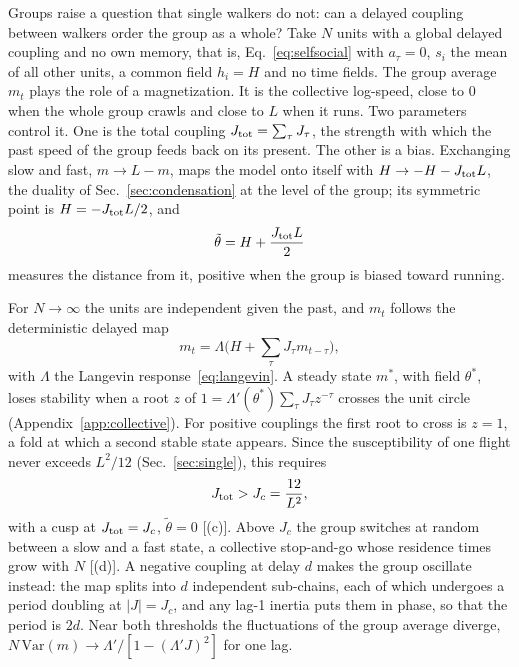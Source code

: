 Groups raise a question that single walkers do not: can a delayed coupling between walkers order the group as a whole? Take $N$ units with a global delayed coupling and no own memory, that is, Eq.~\eqref{eq:selfsocial} with $a_\tau=0$, $s_i$ the mean of all other units, a common field $h_i=H$ and no time fields. The group average $m_t$ plays the role of a magnetization. It is the collective log-speed, close to $0$ when the whole group crawls and close to $L$ when it runs. Two parameters control it. One is the total coupling $J_{\rm tot}=\sum_\tau J_\tau$, the strength with which the past speed of the group feeds back on its present. The other is a bias. Exchanging slow and fast, $m\to L-m$, maps the model onto itself with $H\to-H-J_{\rm tot}L$, the duality of Sec.~\ref{sec:condensation} at the level of the group; its symmetric point is $H=-J_{\rm tot}L/2$, and
\begin{equation}
\tilde\theta=H+\frac{J_{\rm tot}L}2
\end{equation}
measures the distance from it, positive when the group is biased toward running.

For $N\to\infty$ the units are independent given the past, and $m_t$ follows the deterministic delayed map
\begin{equation}
m_t=\Lambda\Big(H+\sum_\tau J_\tau m_{t-\tau}\Big),
\label{eq:map}
\end{equation}
with $\Lambda$ the Langevin response~\eqref{eq:langevin}. A steady state $m^*$, with field $\theta^*$, loses stability when a root $z$ of $1=\Lambda'(\theta^*)\sum_\tau J_\tau z^{-\tau}$ crosses the unit circle (Appendix~\ref{app:collective}). For positive couplings the first root to cross is $z=1$, a fold at which a second stable state appears. Since the susceptibility of one flight never exceeds $L^2/12$ (Sec.~\ref{sec:single}), this requires
\begin{equation}
J_{\rm tot}>J_c=\frac{12}{L^2},
\label{eq:Jc}
\end{equation}
with a cusp at $J_{\rm tot}=J_c$, $\tilde\theta=0$ [(c)]. Above $J_c$ the group switches at random between a slow and a fast state, a collective stop-and-go whose residence times grow with $N$ [(d)]. A negative coupling at delay $d$ makes the group oscillate instead: the map splits into $d$ independent sub-chains, each of which undergoes a period doubling at $|J|=J_c$, and any lag-1 inertia puts them in phase, so that the period is $2d$. Near both thresholds the fluctuations of the group average diverge, $N\,\mathrm{Var}(m)\to\Lambda'/[1-(\Lambda'J)^2]$ for one lag.

